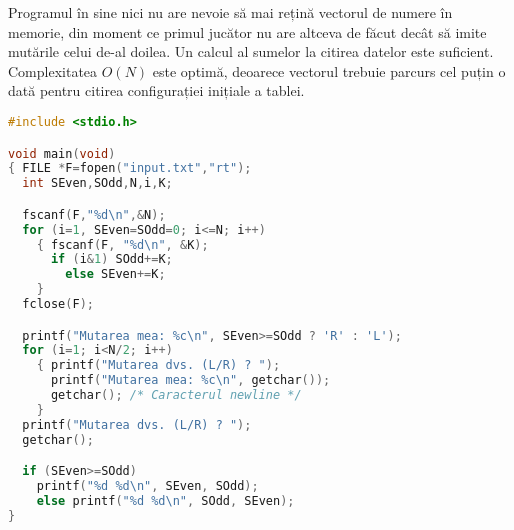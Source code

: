 
Programul în sine nici nu are nevoie să mai rețină vectorul de numere în
memorie, din moment ce primul jucător nu are altceva de făcut decât să imite
mutările celui de-al doilea. Un calcul al sumelor la citirea datelor este
suficient. Complexitatea $O(N)$ este optimă, deoarece vectorul trebuie parcurs
cel puțin o dată pentru citirea configurației inițiale a tablei.

\begin{lstlisting}[language=C]
#include <stdio.h>

void main(void)
{ FILE *F=fopen("input.txt","rt");
  int SEven,SOdd,N,i,K;

  fscanf(F,"%d\n",&N);
  for (i=1, SEven=SOdd=0; i<=N; i++)
    { fscanf(F, "%d\n", &K);
      if (i&1) SOdd+=K;
        else SEven+=K;
    }
  fclose(F);

  printf("Mutarea mea: %c\n", SEven>=SOdd ? 'R' : 'L');
  for (i=1; i<N/2; i++)
    { printf("Mutarea dvs. (L/R) ? ");
      printf("Mutarea mea: %c\n", getchar());
      getchar(); /* Caracterul newline */
    }
  printf("Mutarea dvs. (L/R) ? ");
  getchar();

  if (SEven>=SOdd)
    printf("%d %d\n", SEven, SOdd);
    else printf("%d %d\n", SOdd, SEven);
}
\end{lstlisting}

